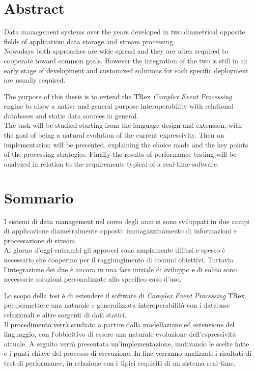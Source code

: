 \chapter*{Abstract}

Data management systems over the years developed in two diametrical opposite fields of application: data storage and stream processing.\\
Nowadays both approaches are wide spread and they are often required to cooperate toward common goals. However the integration of the two is still in an early stage of development and customized solutions for each specific deployment are usually required.

The purpose of this thesis is to extend the TRex \emph{Complex Event Processing} engine \cite{trex} to allow a native and general purpose interoperability with relational databases and static data sources in general.\\
The task will be studied starting from the language design and extension, with the goal of being a natural evolution of the current expressivity. Then an implementation will be presented, explaining the choice made and the key points of the processing strategies. Finally the results of performance testing will be analyzed in relation to the requirements typical of a real-time software.

\chapter*{Sommario}
I sistemi di data management nel corso degli anni si sono sviluppati in due campi di applicazione diametralmente opposti: immagazzinamento di informazioni e processazione di stream.\\
Al giorno d'oggi entrambi gli approcci sono ampiamente diffusi e spesso è necessario che cooperino per il raggiungimento di comuni obiettivi. Tuttavia l'integrazione dei due è ancora in una fase iniziale di sviluppo e di solito sono necessarie soluzioni personalizzate allo specifico caso d'uso.

Lo scopo della tesi è di estendere il software di \emph{Complex Event Processing} TRex \cite{trex} per permettere una naturale e generalizzata interoperabilità con i database relazionali e altre sorgenti di dati statici.\\
Il procedimento verrà studiato a partire dalla modellazione ed estensione del linguaggio, con l'obbiettivo di essere una naturale evoluzione dell'espressività attuale. A seguito verrà presentata un'implementazione, motivando le scelte fatte e i punti chiave del processo di esecuzione. In fine verranno analizzati i risultati di test di performance, in relazione con i tipici requisiti di un sistema real-time.